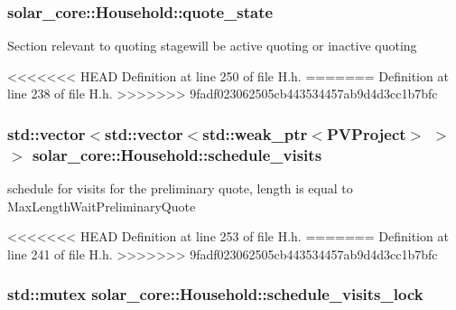\subsubsection[{quote\+\_\+state}]{ solar\+\_\+core\+::\+Household\+::quote\+\_\+state\hspace{0.3cm}{\ttfamily [protected]}}\label{classsolar__core_1_1_household_a4ae618de9a28895317824b185b57ab24}
Section relevant to quoting stagewill be active quoting or inactive quoting 

<<<<<<< HEAD
Definition at line 250 of file H.\+h.
=======
Definition at line 238 of file H.\+h.
>>>>>>> 9fadf023062505cb443534457ab9d4d3cc1b7bfc

\hypertarget{classsolar__core_1_1_household_aadd4e3e2fc66ed214bcfadf37f557b14}{}
\subsubsection[{schedule\+\_\+visits}]{\setlength{\rightskip}{0pt plus 5cm}std\+::vector$<$std\+::vector$<$std\+::weak\+\_\+ptr$<${\bf P\+V\+Project}$>$ $>$ $>$ solar\+\_\+core\+::\+Household\+::schedule\+\_\+visits\hspace{0.3cm}{\ttfamily [protected]}}\label{classsolar__core_1_1_household_aadd4e3e2fc66ed214bcfadf37f557b14}
schedule for visits for the preliminary quote, length is equal to Max\+Length\+Wait\+Preliminary\+Quote 

<<<<<<< HEAD
Definition at line 253 of file H.\+h.
=======
Definition at line 241 of file H.\+h.
>>>>>>> 9fadf023062505cb443534457ab9d4d3cc1b7bfc

\hypertarget{classsolar__core_1_1_household_a15e598cfc419040a23f75fe08a8ef1d8}{}
\subsubsection[{schedule\+\_\+visits\+\_\+lock}]{\setlength{\rightskip}{0pt plus 5cm}std\+::mutex solar\+\_\+core\+::\+Household\+::schedule\+\_\+visits\+\_\+lock\hspace{0.3cm}{\ttfamily [protected]}}\label{classsolar__core_1_1_household_a15e598cfc419040a23f75fe08a8ef1d8}


